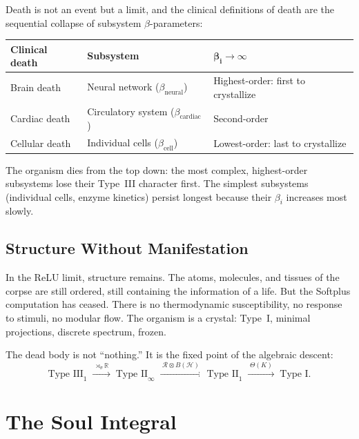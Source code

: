 \documentclass[12pt, letterpaper]{article}
\theoremstyle{plain}
\theoremstyle{definition}
\theoremstyle{remark}
\newcommand{\Real}{\mathbb{R}}
\newcommand{\Hilb}{\mathcal{H}}
\begin{document}
Death is not an event but a limit, and the clinical definitions of death are the sequential collapse of subsystem $\beta$-parameters:
\begin{center}
\renewcommand{\arraystretch}{1.35}
\begin{tabular}{@{}lll@{}}
\toprule
\textbf{Clinical death} & \textbf{Subsystem} & $\boldsymbol{\beta_i \to \infty}$ \\
\midrule
Brain death         & Neural network ($\beta_{\text{neural}}$)  & Highest-order: first to crystallize \\
Cardiac death       & Circulatory system ($\beta_{\text{cardiac}}$)  & Second-order \\
Cellular death      & Individual cells ($\beta_{\text{cell}}$) & Lowest-order: last to crystallize \\
\bottomrule
\end{tabular}
\end{center}

The organism dies from the top down: the most complex, highest-order subsystems lose their Type~III character first. The simplest subsystems (individual cells, enzyme kinetics) persist longest because their $\beta_i$ increases most slowly.

\subsection{Structure Without Manifestation}

In the ReLU limit, structure remains. The atoms, molecules, and tissues of the corpse are still ordered, still containing the information of a life. But the Softplus computation has ceased. There is no thermodynamic susceptibility, no response to stimuli, no modular flow. The organism is a crystal: Type~I, minimal projections, discrete spectrum, frozen.

The dead body is not ``nothing.'' It is the fixed point of the algebraic descent:
\begin{equation}
  \text{Type~III}_1 \;\xrightarrow{\;\rtimes_\sigma \Real\;}\; \text{Type~II}_\infty
  \;\xrightarrow{\;\mathcal{R}\otimes B(\Hilb)\;}\; \text{Type~II}_1
  \;\xrightarrow{\;\Theta(K)\;}\; \text{Type~I}.
\end{equation}


\section{The Soul Integral}
\label{sec:soul}
\end{document}

